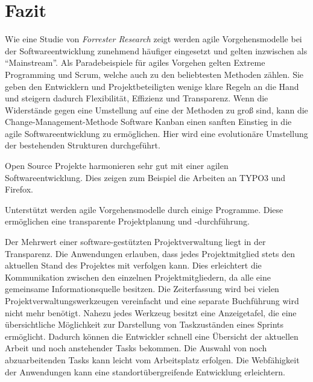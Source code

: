 \section{Fazit}
Wie eine Studie von \emph{Forrester Research} zeigt werden agile Vorgehensmodelle bei der Softwareentwicklung zunehmend häufiger eingesetzt und gelten inzwischen als ``Mainstream''. \cite{bib:ane} Als Paradebeispiele für agiles Vorgehen gelten Extreme Programming und Scrum, welche auch zu den beliebtesten Methoden zählen. Sie geben den Entwicklern und Projektbeteiligten wenige klare Regeln an die Hand und steigern dadurch Flexibilität, Effizienz und Transparenz. \cite[S. 28 f.]{bib:wolfRoock} Wenn die Widerstände gegen eine Umstellung auf eine der Methoden zu groß sind, kann die Change-Management-Methode Software Kanban einen sanften Einstieg in die agile Softwareentwicklung zu ermöglichen. Hier wird eine evolutionäre Umstellung der bestehenden Strukturen durchgeführt.

Open Source Projekte harmonieren sehr gut mit einer agilen Softwareentwicklung. Dies zeigen zum Beispiel die Arbeiten an TYPO3 und Firefox. 

Unterstützt werden agile Vorgehensmodelle durch einige Programme. Diese ermöglichen eine transparente Projektplanung und -durchführung.

Der Mehrwert einer software-gestützten Projektverwaltung liegt in der Transparenz. Die Anwendungen erlauben, dass jedes Projektmitglied stets den aktuellen Stand des Projektes mit verfolgen kann. Dies erleichtert die Kommunikation zwischen den einzelnen Projektmitgliedern, da alle eine gemeinsame Informationsquelle besitzen. Die Zeiterfassung wird bei vielen Projektverwaltungswerkzeugen vereinfacht und eine separate Buchführung wird nicht mehr benötigt. Nahezu jedes Werkzeug besitzt eine Anzeigetafel, die eine übersichtliche Möglichkeit zur Darstellung von Taskzuständen eines Sprints ermöglicht. Dadurch können die Entwickler schnell eine Übersicht der aktuellen Arbeit und noch anstehender Tasks bekommen. Die Auswahl von noch abzuarbeitenden Tasks kann leicht vom Arbeitsplatz erfolgen. Die Webfähigkeit der Anwendungen kann eine standortübergreifende Entwicklung erleichtern.
